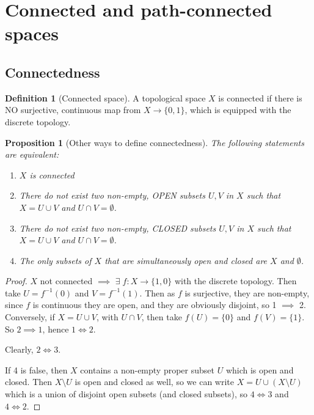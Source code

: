 \documentclass{article}
\theoremstyle{definition}
\newtheorem{defn}{Definition}[section]
\theoremstyle{plain}%
\newtheorem{prop}[thm]{Proposition}
\theoremstyle{remark}
\newcommand{\union}{\cup}
\newcommand{\intersection}{\cap}
\begin{document}
\section{Connected and path-connected spaces}

\subsection{Connectedness}

\begin{defn}[Connected space]
    A topological space $X$ is connected if there is NO surjective, continuous map from $X \to \{0,1\}$, which is equipped with the discrete topology.
\end{defn}

\begin{prop}[Other ways to define connectedness]
    The following statements are equivalent:
    \begin{enumerate}
        \item $X$ is connected
        \item There do not exist two non-empty, OPEN subsets $U, V$ in $X$ such that $X = U \union V$ and $U \intersection V = \emptyset$.
        \item There do not exist two non-empty, CLOSED subsets $U, V$ in $X$ such that $X = U \union V$ and $U \intersection V = \emptyset$.
        \item The only subsets of $X$ that are simultaneously open and closed are $X$ and $\emptyset$.
    \end{enumerate}
\end{prop}

\begin{proof}
    $X$ not connected $\implies$ $\exists \; f : X \to \{1,0\}$ with the discrete topology. Then take $U=f^{-1}(0)$ and $V = f^{-1}(1)$. Then as $f$ is surjective, they are non-empty, since $f$ is continuous they are open, and they are obviously disjoint, so 1 $\implies$ 2. Conversely, if $X=U\union V$, with $U \intersection V$, then take $f(U) = \{0\}$ and $f(V) = \{1\}$. So $2 \implies 1$, hence $1 \Leftrightarrow 2$.
    
    Clearly, $2 \Leftrightarrow 3$.
    
    If 4 is false, then $X$ contains a non-empty proper subset $U$ which is open and closed. Then $X \setminus U$ is open and closed as well, so we can write $X = U \union (X \setminus U)$ which is a union of disjoint open subsets (and closed subsets), so $4 \Leftrightarrow 3$ and $4 \Leftrightarrow 2$.
\end{proof}
\end{document}
